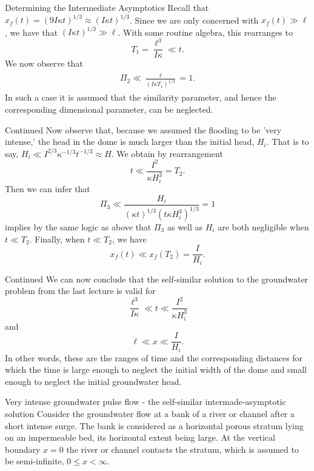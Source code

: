 \documentclass[10pt]{beamer}
\begin{document}
\begin{frame}{Determining the Intermediate Asymptotics}
  Recall that $x_f(t) = (9I\kappa t)^{1/3} \approx (I\kappa t)^{1/3}$.
  Since we are only concerned with $x_f(t) \gg \ell$, we have that $(I\kappa t)^{1/3} \gg \ell$.
  With some routine algebra, this rearranges to $$T_1 = \frac{\ell^3}{I\kappa} \ll t.$$
  We now observe that 
  \begin{align*}
    \begin{split}
      \Pi_2 \ll \frac{\ell}{(I\kappa T_1)^{1/3}} = 1.
    \end{split}
  \end{align*}
  In such a case it is assumed that the similarity parameter, and hence the corresponding dimensional parameter, can be neglected.
\end{frame}

\begin{frame}{Continued}
  Now observe that, because we assumed the flooding to be 'very intense,' the head in the dome is much larger than the initial head, $H_i$.
  That is to say, $H_i \ll I^{2/3}\kappa^{-1/3}t^{-1/3} \approx H$.
  We obtain by rearrangement
  $$t \ll \frac{I^2}{\kappa H_i^3} = T_2.$$
  Then we can infer that 
  $$\Pi_3 \ll \frac{H_i}{(\kappa t)^{1/3}(t\kappa  H_i^3)^{1/3}} = 1$$ 
  implies by the same logic as above that $\Pi_3$ as well as $H_i$ are both negligible when $t \ll T_2$.
  Finally, when $t \ll T_2$, we have $$x_f(t) \ll x_f(T_2) = \frac{I}{H_i}.$$
\end{frame}

\begin{frame}{Continued}
  We can now conclude that the self-similar solution to the groundwater problem from the last lecture is valid for $$\frac{\ell^3}{I\kappa} \ll t \ll \frac{I^2}{\kappa H_i^3}$$ and $$\ell \ll x \ll \frac{I}{H_i}.$$
  In other words, these are the ranges of time and the corresponding distances for which the time is large enough to neglect the initial width of the dome and small enough to neglect the initial groundwater head.

\end{frame}

\begin{frame}{Very intense groundwater pulse flow - the self-similar intermade-asymptotic solution}
  Consider the groundwater flow at a bank of a river or channel after a short intense surge.  
  The bank is considered as a horizontal porous stratum lying on an impermeable bed, its horizontal extent being large.
  At the vertical boundary $x = 0$ the river or channel contacts the stratum, which is assumed to be semi-infinite, $0 \leq x < \infty$.
\end{frame}
\end{document}
